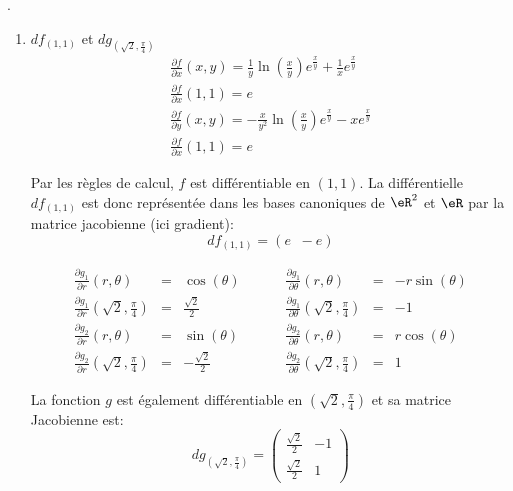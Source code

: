 .
\begin{enumerate}
\item $df_{(1,1)}$ et $dg_{(\sqrt2,\frac{\pi}{4})}$\\
    \[\begin{array}{l}\frac{ \partial f }{ \partial x }(x,y) = \frac{1}{y}\ln(\frac{x}{y})e^{\frac{x}{y}}+\frac{1}{x}e^{\frac{x}{y}}\\
            \frac{ \partial f }{ \partial x }(1,1)=e\\
            \frac{ \partial f }{ \partial y }(x,y)=-\frac{x}{y^2}\ln(\frac{x}{y})e^{\frac{x}{y}}-xe^{\frac{x}{y}}\\
        \frac{ \partial f }{ \partial x }(1,1)=e\end{array}\]

 \noindent Par les règles de calcul, $f$ est différentiable en $(1,1)$. La différentielle $df_{(1,1)}$ est donc représentée dans les bases canoniques de $\eR^2$ et $\eR$ par la matrice jacobienne (ici gradient):\[df_{(1,1)}=(e \;\; -e)\]

 \[\begin{array}{lclllllcl}\frac{ \partial g_1 }{ \partial r }(r,\theta) &=&\cos(\theta)& & & & \frac{ \partial g_1 }{ \partial \theta }(r,\theta)   & =&-r\sin(\theta)\\
         \frac{ \partial g_1 }{ \partial r }(\sqrt2, \frac{\pi}{4})&=&\frac{\sqrt2}{2}& & &&\frac{ \partial g_1 }{ \partial \theta }(\sqrt2, \frac{\pi}{4})& =&-1 \\
         \frac{ \partial g_2 }{ \partial r }(r,\theta) &=&\sin(\theta)&  && &\frac{ \partial g_2 }{ \partial \theta }(r,\theta)  &=&r\cos(\theta) \\
     \frac{ \partial g_2 }{ \partial r }(\sqrt2, \frac{\pi}{4})&=&-\frac{\sqrt2}{2}&& & &\frac{ \partial g_2 }{ \partial \theta }(\sqrt2, \frac{\pi}{4})& = &1\end{array}\]

La fonction $g$ est également différentiable en $(\sqrt2, \frac{\pi}{4})$ et sa matrice Jacobienne est:
\[dg_{(\sqrt2, \frac{\pi}{4})}=\left(\begin{array}{cc} \frac{\sqrt2}{2} & -1\\
    \frac{\sqrt2}{2}&1\end{array}\right)\]



\end{enumerate}
